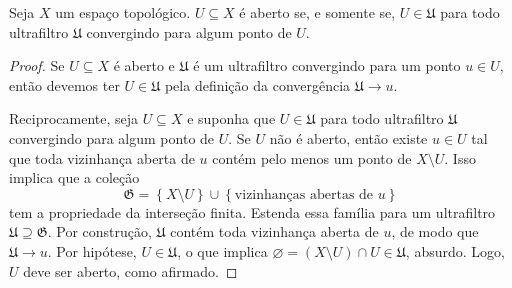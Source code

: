  \begin{theorem}
 \label{teo:2.2}
 Seja
 $X$
 um espaço topológico.
 $U \subseteq X$ 
 é aberto se, e somente se, 
 $U \in \mathfrak{U}$
 para todo ultrafiltro
 $\mathfrak{U}$
 convergindo para algum ponto de
 $U$.
 \end{theorem}
 \begin{proof}
 Se 
 $U \subseteq X$
 é aberto e
 $\mathfrak{U}$
 é um ultrafiltro convergindo para um ponto
 $u \in U$,
 então devemos ter
 $U \in \mathfrak{U}$
 pela definição da convergência
 $\mathfrak{U} \to u$.
 
 Reciprocamente, seja
 $U \subseteq X$
 e suponha que
 $U \in \mathfrak{U}$
 para todo ultrafiltro
 $\mathfrak{U}$
 convergindo para algum ponto de
 $U$.
 Se 
 $U$ 
 não é aberto, então existe
 $u \in U$
 tal que toda vizinhança aberta de 
 $u$
 contém pelo menos um ponto de
 $X \setminus U$.
 Isso implica que a coleção
 \begin{equation*}
     \mathfrak{G}
     =
     \left\{ X \setminus U \right\} \cup \left\{ \text{vizinhanças abertas de } u \right\}
 \end{equation*}
 tem a propriedade da interseção finita.
 Estenda essa família para um ultrafiltro
 $\mathfrak{U} \supseteq \mathfrak{G}$.
 Por construção, 
 $\mathfrak{U}$
 contém toda vizinhança aberta de 
 $u$,
 de modo que
 $\mathfrak{U} \to u$.
 Por hipótese, 
 $U \in \mathfrak{U}$,
 o que implica
 $\varnothing = (X \setminus U) \cap U \in \mathfrak{U}$,
 absurdo. 
 Logo, 
 $U$
 deve ser aberto, como afirmado.
 \end{proof}